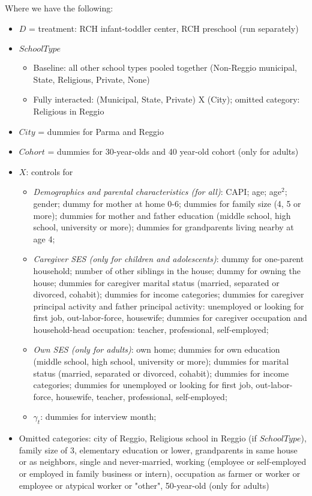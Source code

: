 \documentclass[12pt,english]{article}
\begin{document}
Where we have the following:
\begin{itemize}
	\item $D$ = treatment: RCH infant-toddler center, RCH preschool (run separately)
	\item $SchoolType$
	\begin{itemize}
		\item Baseline: all other school types pooled together (Non-Reggio municipal, 	State, Religious, Private, None)
		\item Fully interacted: (Municipal, State, Private) X (City); omitted	category: Religious in Reggio
	\end{itemize}
	\item $City$ = dummies for Parma and Reggio
	\item $Cohort$ = dummies for 30-year-olds and 40 year-old cohort (only for adults)
	\item $X$: controls for 
	\begin{itemize}
		\item \textit{Demographics and parental characteristics (for all)}: CAPI; age; age$^2$; gender; dummy for mother at home 0-6; dummies for family size (4, 5 or more); dummies for mother and father education (middle school, high school, university or more); dummies for grandparents living nearby at age 4;
		\item \textit{Caregiver SES (only for children and adolescents)}: dummy for one-parent household; number of other siblings in the house; dummy for owning the house; dummies for caregiver marital status (married, separated or divorced, cohabit); dummies for income categories; dummies for caregiver principal activity and father principal activity: unemployed or looking for first job, out-labor-force, housewife; dummies for caregiver occupation and household-head occupation: teacher, professional, self-employed;
		\item \textit{Own SES (only for adults)}: own home; dummies for own education (middle school, high school, university or more); dummies for marital status (married, separated or divorced, cohabit); dummies for income categories; dummies for unemployed or looking for first job, out-labor-force, housewife, teacher, professional, self-employed;
		\item $\gamma_t$: dummies for interview month; 
	\end{itemize}
\item Omitted categories: city of Reggio, Religious school in Reggio (if $SchoolType$), family size of 3, elementary education or lower, grandparents in same house or as neighbors, single and never-married, working (employee or self-employed or employed in family business or intern), occupation as farmer or worker or employee or atypical worker or "other", 50-year-old (only for adults)
\end{itemize}
\end{document}
